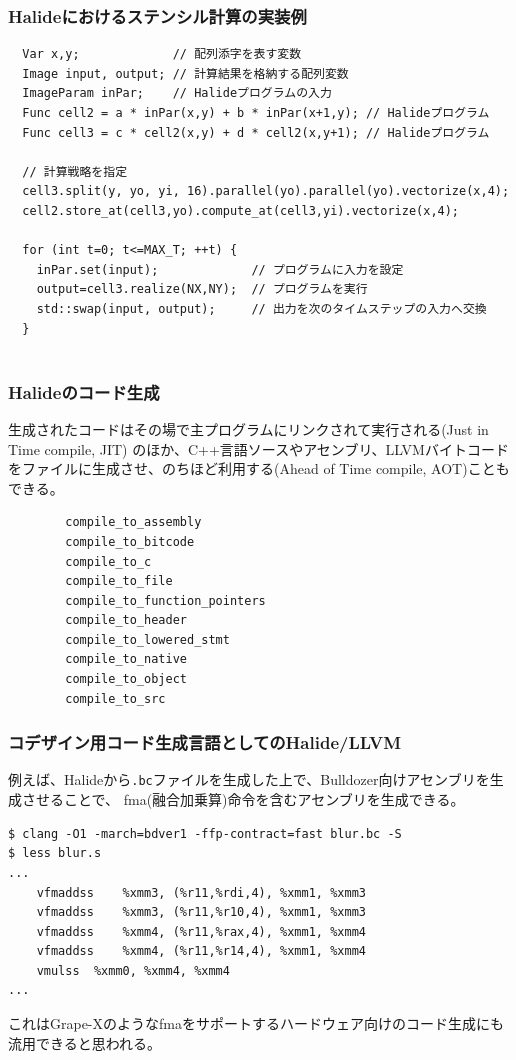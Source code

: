 \documentclass[dvipdfmx,cjk]{beamer}
\begin{document}
\begin{frame}[fragile]\frametitle{Halideにおけるステンシル計算の実装例}

\begingroup
    \fontsize{9pt}{10pt}\selectfont
\begin{verbatim}
  Var x,y;             // 配列添字を表す変数
  Image input, output; // 計算結果を格納する配列変数
  ImageParam inPar;    // Halideプログラムの入力
  Func cell2 = a * inPar(x,y) + b * inPar(x+1,y); // Halideプログラム
  Func cell3 = c * cell2(x,y) + d * cell2(x,y+1); // Halideプログラム

  // 計算戦略を指定
  cell3.split(y, yo, yi, 16).parallel(yo).parallel(yo).vectorize(x,4);
  cell2.store_at(cell3,yo).compute_at(cell3,yi).vectorize(x,4);

  for (int t=0; t<=MAX_T; ++t) {
    inPar.set(input);             // プログラムに入力を設定
    output=cell3.realize(NX,NY);  // プログラムを実行
    std::swap(input, output);     // 出力を次のタイムステップの入力へ交換
  }


\end{verbatim}
\endgroup


\end{frame}


\begin{frame}[fragile]\frametitle{Halideのコード生成}

生成されたコードはその場で主プログラムにリンクされて実行される(Just in Time compile, JIT)
のほか、C++言語ソースやアセンブリ、LLVMバイトコードをファイルに生成させ、のちほど利用する(Ahead of Time compile, AOT)こともできる。

\begingroup
    \fontsize{9pt}{10pt}\selectfont
\begin{verbatim}
        compile_to_assembly
        compile_to_bitcode
        compile_to_c
        compile_to_file
        compile_to_function_pointers
        compile_to_header
        compile_to_lowered_stmt
        compile_to_native
        compile_to_object
        compile_to_src
\end{verbatim}
\endgroup

\end{frame}


\begin{frame}[fragile]\frametitle{コデザイン用コード生成言語としてのHalide/LLVM}

例えば、Halideから{\tt .bc}ファイルを生成した上で、Bulldozer向けアセンブリを生成させることで、
fma(融合加乗算)命令を含むアセンブリを生成できる。

\begingroup
    \fontsize{8pt}{9pt}\selectfont
\begin{verbatim}
$ clang -O1 -march=bdver1 -ffp-contract=fast blur.bc -S
$ less blur.s
...
	vfmaddss	%xmm3, (%r11,%rdi,4), %xmm1, %xmm3
	vfmaddss	%xmm3, (%r11,%r10,4), %xmm1, %xmm3
	vfmaddss	%xmm4, (%r11,%rax,4), %xmm1, %xmm4
	vfmaddss	%xmm4, (%r11,%r14,4), %xmm1, %xmm4
	vmulss	%xmm0, %xmm4, %xmm4
...
\end{verbatim}
\endgroup

これはGrape-Xのようなfmaをサポートするハードウェア向けのコード生成にも流用できると思われる。


\end{frame}
\end{document}
